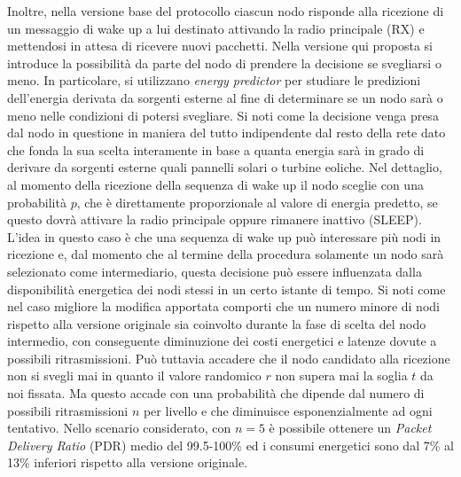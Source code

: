 \documentclass[binding=0.6cm,TFA]{sapthesis}
\begin{document}
Inoltre, nella versione base del protocollo ciascun nodo risponde alla ricezione di un messaggio di wake up a lui destinato attivando la radio principale (RX) e mettendosi
in attesa di ricevere nuovi pacchetti. Nella versione qui proposta si introduce la possibilità da parte del nodo di prendere la decisione se svegliarsi o meno.
In particolare, si utilizzano \emph{energy predictor} per studiare le predizioni dell'energia derivata da sorgenti esterne al fine di determinare se un nodo sarà o
meno nelle condizioni di potersi svegliare. Si noti come la decisione venga presa dal nodo in questione in maniera del tutto indipendente dal resto della rete dato
che fonda la sua scelta interamente in base a quanta energia sarà in grado di derivare da sorgenti esterne quali pannelli solari o turbine eoliche. Nel dettaglio,
al momento della ricezione della sequenza di wake up il nodo sceglie con una probabilità $p$, che è direttamente proporzionale al valore di energia predetto,
se questo dovrà attivare la radio principale oppure rimanere inattivo (SLEEP).\\

L'idea in questo caso è che una sequenza di wake up può interessare più nodi
in ricezione e, dal momento che al termine della procedura solamente un nodo sarà selezionato come intermediario, questa decisione può essere influenzata dalla
disponibilità energetica dei nodi stessi in un certo istante di tempo. Si noti come nel caso migliore la modifica apportata comporti che un numero minore di nodi
rispetto alla versione originale sia coinvolto durante la fase di scelta del nodo intermedio, con conseguente diminuzione dei costi energetici e latenze dovute a
possibili ritrasmissioni. Può tuttavia accadere che il nodo candidato alla ricezione non si svegli mai in quanto il valore randomico $r$ non supera mai la
soglia $t$ da noi fissata. Ma questo accade con una probabilità che dipende dal numero di possibili ritrasmissioni $n$ per livello e che diminuisce esponenzialmente
ad ogni tentativo. Nello scenario considerato, con $n=5$ è possibile ottenere un \emph{Packet Delivery Ratio} (PDR) medio del 99.5-100\% ed i consumi
energetici sono dal 7\% al 13\% inferiori rispetto alla versione originale.\\
\end{document}
